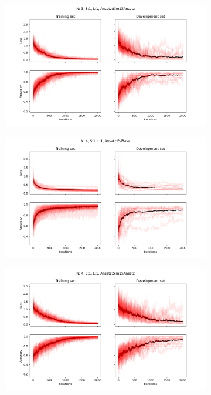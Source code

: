\begin{figure}
\begin{subfigure}[b]{.49\textwidth}
\end{subfigure}
\begin{subfigure}[b]{.49\textwidth}
    \centering
    \includegraphics[width=\textwidth]{figures/single_model/Sim15Ansatz/Epochs_2000--A_0.05--N_3--S_1--L_1.png}
\end{subfigure}
\begin{subfigure}[b]{.49\textwidth}
    \centering
    \includegraphics[width=\textwidth]{figures/single_model/FslBase/Epochs_2000--A_0.05--N_4--S_1--L_1--Ansatz_FslBase.png}
\end{subfigure}
\begin{subfigure}[b]{.49\textwidth}
    \centering
    \includegraphics[width=\textwidth]{figures/single_model/Sim15Ansatz/Epochs_2000--A_0.05--N_4--S_1--L_1.png}

\end{subfigure}
\end{figure}
